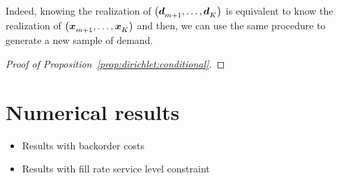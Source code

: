 Indeed, knowing the realization of $\bracket{\va\demand_{m+1},\ldots,\va\demand_K}$ is equivalent to know the realization of $\bracket{\va x_{m+1},\ldots,\va x_K}$ and then, we can use the same procedure to generate a new sample of demand.

\begin{proof}[Proof of Proposition~\ref{prop:dirichlet:conditional}]
\end{proof}


\section{Numerical results}



\begin{itemize}
  \item Results with backorder costs
  \item Results with fill rate service level constraint
\end{itemize}
